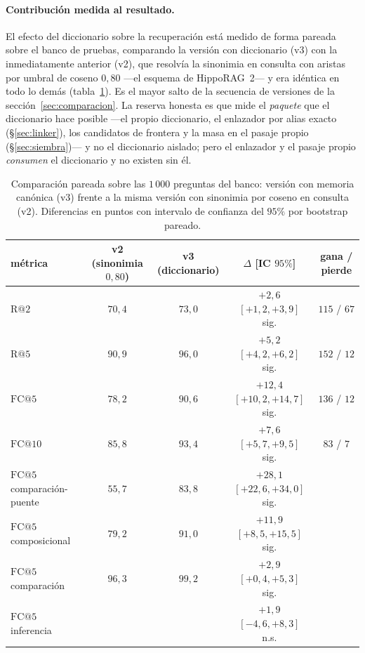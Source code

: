 \documentclass[11pt,a4paper]{article}
\newcommand{\hippo}{HippoRAG~2}
\begin{document}
\paragraph{Contribución medida al resultado.}
El efecto del diccionario sobre la recuperación está medido de forma
pareada sobre el banco de pruebas, comparando la versión con diccionario
(v3) con la inmediatamente anterior (v2), que resolvía la sinonimia en
consulta con aristas por umbral de coseno $0{,}80$ ---el esquema de
\hippo{}--- y era idéntica en todo lo demás (tabla~\ref{tab:dicc-impacto}).
Es el mayor salto de la secuencia de versiones de la
sección~\ref{sec:comparacion}. La reserva honesta es que mide el
\emph{paquete} que el diccionario hace posible ---el propio diccionario, el
enlazador por alias exacto (\S\ref{sec:linker}), los candidatos de frontera
y la masa en el pasaje propio (\S\ref{sec:siembra})--- y no el diccionario
aislado; pero el enlazador y el pasaje propio \emph{consumen} el diccionario
y no existen sin él.

\begin{table}[t]
\centering\footnotesize\setlength{\tabcolsep}{5pt}
\caption{Comparación pareada sobre las $1\,000$ preguntas del banco: versión
con memoria canónica (v3) frente a la misma versión con sinonimia por
coseno en consulta (v2). Diferencias en puntos con intervalo de confianza
del $95\%$ por bootstrap pareado.}
\label{tab:dicc-impacto}
\begin{tabular}{lcccc}
\toprule
métrica & v2 (sinonimia $0{,}80$) & v3 (diccionario) & $\Delta$ [IC $95\%$] & gana / pierde\\
\midrule
$\mathrm{R@}2$ & $70{,}4$ & $73{,}0$ & $+2{,}6$ $[+1{,}2, +3{,}9]$ sig. & $115$ / $67$\\
$\mathrm{R@}5$ & $90{,}9$ & $96{,}0$ & $+5{,}2$ $[+4{,}2, +6{,}2]$ sig. & $152$ / $12$\\
$\mathrm{FC@}5$ & $78{,}2$ & $90{,}6$ & $+12{,}4$ $[+10{,}2, +14{,}7]$ sig. & $136$ / $12$\\
$\mathrm{FC@}10$ & $85{,}8$ & $93{,}4$ & $+7{,}6$ $[+5{,}7, +9{,}5]$ sig. & $83$ / $7$\\
\midrule
$\mathrm{FC@}5$ comparación-puente & $55{,}7$ & $83{,}8$ & $+28{,}1$ $[+22{,}6, +34{,}0]$ sig. & \\
$\mathrm{FC@}5$ composicional & $79{,}2$ & $91{,}0$ & $+11{,}9$ $[+8{,}5, +15{,}5]$ sig. & \\
$\mathrm{FC@}5$ comparación & $96{,}3$ & $99{,}2$ & $+2{,}9$ $[+0{,}4, +5{,}3]$ sig. & \\
$\mathrm{FC@}5$ inferencia & & & $+1{,}9$ $[-4{,}6, +8{,}3]$ n.s. & \\
\bottomrule
\end{tabular}
\end{table}
\end{document}
